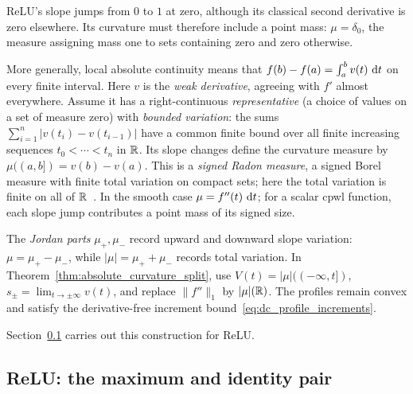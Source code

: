 \begin{remark}\label{rem:bv_extension}
ReLU's slope jumps from $0$ to $1$ at zero, although its classical second derivative is zero elsewhere. Its curvature must therefore include a point mass: $\mu=\delta_0$, the measure assigning mass one to sets containing zero and zero otherwise.

More generally, local absolute continuity means that $f(b)-f(a)=\int_a^b v(t)\,\mathop{}\!\textrm{d} t$ on every finite interval. Here $v$ is the \emph{weak derivative}, agreeing with $f'$ almost everywhere. Assume it has a right-continuous \emph{representative} (a choice of values on a set of measure zero) with \emph{bounded variation}: the sums $\sum_{i=1}^n|v(t_i)-v(t_{i-1})|$ have a common finite bound over all finite increasing sequences $t_0<\cdots<t_n$ in $\mathbb{R}$. Its slope changes define the curvature measure by $\mu((a,b])=v(b)-v(a)$. This is a \emph{signed Radon measure}, a signed Borel measure with finite total variation on compact sets; here the total variation is finite on all of $\mathbb{R}$~\parencite[Sections~3.A--3.C]{Hunter2014PDE}. In the smooth case $\mu=f''(t)\,\mathop{}\!\textrm{d} t$; for a scalar \ac{cpwl} function, each slope jump contributes a point mass of its signed size.

The \emph{Jordan parts} $\mu_+,\mu_-$ record upward and downward slope variation: $\mu=\mu_+-\mu_-$, while $|\mu|=\mu_++\mu_-$ records total variation. In Theorem~\ref{thm:absolute_curvature_split}, use $V(t)=|\mu|(({-\infty},t])$, $s_\pm=\lim_{t\to\pm\infty}v(t)$, and replace $\|f''\|_1$ by $|\mu|(\mathbb{R})$. The profiles remain convex and satisfy the derivative-free increment bound~\eqref{eq:dc_profile_increments}.

Section~\ref{sec:dc_splitting_relu} carries out this construction for ReLU.
\end{remark}

\subsection{ReLU: the maximum and identity pair}\label{sec:dc_splitting_relu}

